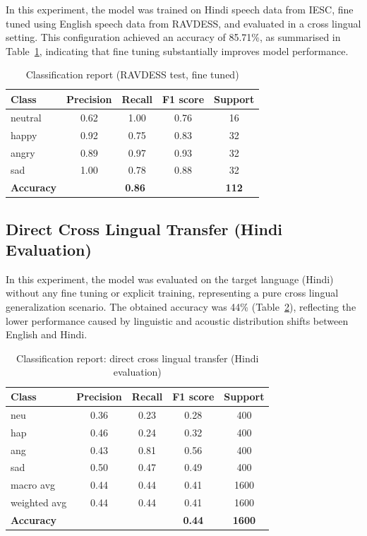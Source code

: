 \documentclass[runningheads]{llncs}
\begin{document}
In this experiment, the model was trained on Hindi speech data from IESC, fine tuned using English speech data from RAVDESS, and evaluated in a cross lingual setting. This configuration achieved an accuracy of 85.71\%, as summarised in Table~\ref{tab:cr_B}, indicating that fine tuning substantially improves model performance.

\begin{table}[htbp]
\centering
\caption{Classification report (RAVDESS test, fine tuned)}
\label{tab:cr_B}
\renewcommand{\arraystretch}{1.2}
\begin{tabular}{lcccc}
\toprule
\textbf{Class} & \textbf{Precision} & \textbf{Recall} & \textbf{F1 score} & \textbf{Support} \\
\midrule
neutral & 0.62 & 1.00 & 0.76 & 16 \\
happy   & 0.92 & 0.75 & 0.83 & 32 \\
angry   & 0.89 & 0.97 & 0.93 & 32 \\
sad     & 1.00 & 0.78 & 0.88 & 32 \\
\midrule
\textbf{Accuracy} & \multicolumn{3}{c}{\textbf{0.86}} & \textbf{112} \\
\bottomrule
\end{tabular}
\end{table}

\subsection{Direct Cross Lingual Transfer (Hindi Evaluation)}

In this experiment, the model was evaluated on the target language (Hindi) without any fine tuning or explicit training, representing a pure cross lingual generalization scenario. The obtained accuracy was 44\% (Table~\ref{tab:cr_C}), reflecting the lower performance caused by linguistic and acoustic distribution shifts between English and Hindi.

\begin{table}[htbp]
\centering
\caption{Classification report: direct cross lingual transfer (Hindi evaluation)}
\label{tab:cr_C}
\renewcommand{\arraystretch}{1.2}
\begin{tabular}{lcccc}
\toprule
\textbf{Class} & \textbf{Precision} & \textbf{Recall} & \textbf{F1 score} & \textbf{Support} \\
\midrule
neu           & 0.36 & 0.23 & 0.28 & 400  \\
hap           & 0.46 & 0.24 & 0.32 & 400  \\
ang           & 0.43 & 0.81 & 0.56 & 400  \\
sad           & 0.50 & 0.47 & 0.49 & 400  \\
\midrule
macro avg     & 0.44 & 0.44 & 0.41 & 1600 \\
weighted avg  & 0.44 & 0.44 & 0.41 & 1600 \\
\midrule
\textbf{Accuracy} & & & \textbf{0.44} & \textbf{1600} \\
\bottomrule
\end{tabular}
\end{table}
\end{document}
